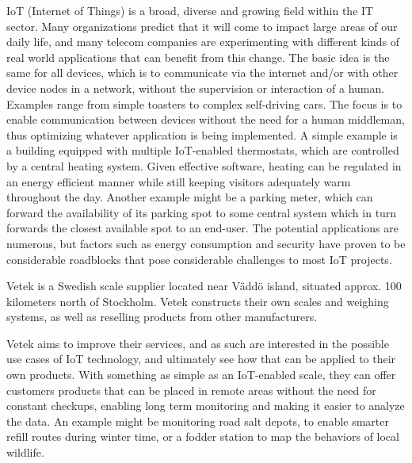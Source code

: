 






IoT (Internet of Things) is a broad, diverse and growing field within the IT sector. Many organizations predict that it will come to impact large areas of our daily life, and many telecom companies are experimenting with different kinds of real world applications that can benefit from this change. The basic idea is the same for all devices, which is to communicate via the internet and/or with other device nodes in a network, without the supervision or interaction of a human. Examples range from simple toasters to complex self-driving cars.\cite{what_is_iot} The focus is to enable communication between devices without the need for a human middleman, thus optimizing whatever application is being implemented. A simple example is a building equipped with multiple IoT-enabled thermostats, which are controlled by a central heating system. Given effective software, heating can be regulated in an energy efficient manner while still keeping visitors adequately warm throughout the day. Another example might be a parking meter, which can forward the availability of its parking spot to some central system which in turn forwards the closest available spot to an end-user. The potential applications are numerous, but factors such as energy consumption and security have proven to be considerable roadblocks that pose considerable challenges to most IoT projects.

Vetek is a Swedish scale supplier located near Väddö island, situated approx. 100 kilometers north of Stockholm. Vetek constructs their own scales and weighing systems, as well as reselling products from other manufacturers.\cite{vetek} 

Vetek aims to improve their services, and as such are interested in the possible use cases of IoT technology, and ultimately see how that can be applied to their own products. With something as simple as an IoT-enabled scale, they can offer customers products that can be placed in remote areas without the need for constant checkups, enabling long term monitoring and making it easier to analyze the data. An example might be monitoring road salt depots, to enable smarter refill routes during winter time, or a fodder station to map the behaviors of local wildlife.


